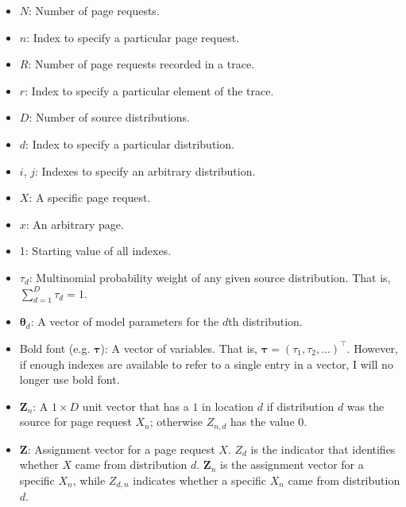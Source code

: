   \begin{itemize}
  \item $N$: Number of page requests.

  \item $n$: Index to specify a particular page request.

  \item $R$: Number of page requests recorded in a trace.

  \item $r$: Index to specify a particular element of the trace.

  \item $D$: Number of source distributions.

  \item $d$: Index to specify a particular distribution.

  \item $i$, $j$: Indexes to specify an arbitrary distribution.

  \item $X$: A specific page request.

  \item $x$: An arbitrary page.

  \item 1: Starting value of all indexes.

  \item $\tau_d$: Multinomial probability weight of any given source
  distribution. That is, $\sum_{d=1}^{D} \tau_d = 1$.

  \item $\bm{\theta}_d$: A vector of model parameters for the $d$th
  distribution.

  \item Bold font (e.g. $\bm{\tau}$): A vector of variables. That is,
  $\bm{\tau} = (\tau_1, \tau_2, ...)^{\intercal}$. However, if enough indexes
  are available to refer to a single entry in a vector, I will no longer use
  bold font.

  \item $\bm{Z}_n$: A $1 \times D$ unit vector that has a $1$ in location $d$
  if distribution $d$ was the source for page request $X_n$; otherwise
  $Z_{n,d}$ has the value 0.

  \item $\bm{Z}$: Assignment vector for a page request $X$. $Z_d$ is the
  indicator that identifies whether $X$ came from distribution $d$. $\bm{Z}_n$
  is the assignment vector for a specific $X_n$, while $Z_{d,n}$ indicates
  whether a specific $X_n$ came from distribution $d$.


\end{itemize}
